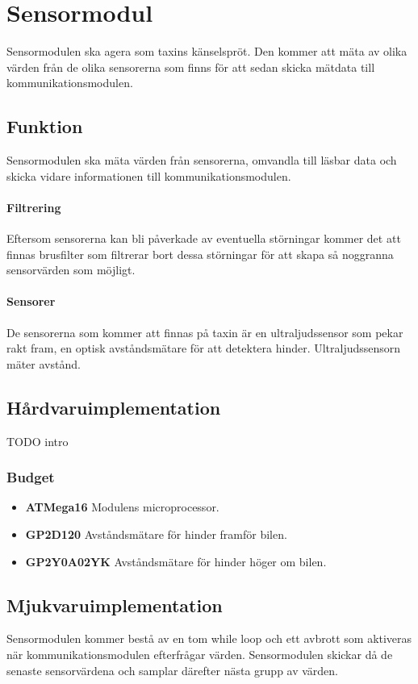 \documentclass[designspec/spec.tex]{subfiles}
\begin{document}
\section{Sensormodul}
Sensormodulen ska agera som taxins känselspröt. Den kommer att mäta av olika
värden från de olika sensorerna som finns för att sedan skicka mätdata till
kommunikationsmodulen.

\subsection{Funktion}
Sensormodulen ska mäta värden från sensorerna, omvandla till läsbar data och
skicka vidare informationen till kommunikationsmodulen.

\paragraph{Filtrering}
Eftersom sensorerna kan bli påverkade av eventuella störningar kommer det att
finnas brusfilter som filtrerar bort dessa störningar för att skapa så
noggranna sensorvärden som möjligt.

\paragraph{Sensorer}
De sensorerna som kommer att finnas på taxin är en ultraljudssensor som pekar
rakt fram, en optisk avståndsmätare för att detektera hinder.
Ultraljudssensorn mäter avstånd.

\subsection{Hårdvaruimplementation} 
TODO intro

\subsubsection{Budget}

\begin{itemize}
	\item \textbf{ATMega16} Modulens microprocessor. 
    \item \textbf{GP2D120} Avståndsmätare för hinder framför bilen.
    \item \textbf{GP2Y0A02YK} Avståndsmätare för hinder höger om bilen.
\end{itemize}

\subsection{Mjukvaruimplementation} 
Sensormodulen kommer bestå av en tom while loop och ett avbrott som aktiveras
när kommunikationsmodulen efterfrågar värden. Sensormodulen skickar då de
senaste sensorvärdena och samplar därefter nästa grupp av värden.
\end{document}
